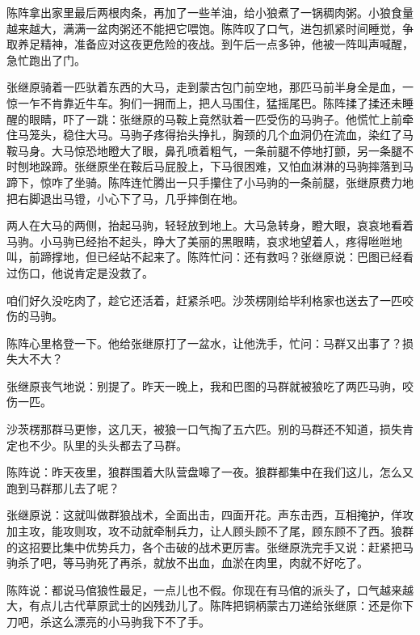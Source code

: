 

\par 陈阵拿出家里最后两根肉条，再加了一些羊油，给小狼煮了一锅稠肉粥。小狼食量越来越大，满满一盆肉粥还不能把它喂饱。陈阵叹了口气，进包抓紧时间睡觉，争取养足精神，准备应对这夜更危险的夜战。到午后一点多钟，他被一阵叫声喊醒，急忙跑出了门。
\par 张继原骑着一匹驮着东西的大马，走到蒙古包门前空地，那匹马前半身全是血，一惊一乍不肯靠近牛车。狗们一拥而上，把人马围住，猛摇尾巴。陈阵揉了揉还未睡醒的眼睛，吓了一跳：张继原的马鞍上竟然驮着一匹受伤的马驹子。他慌忙上前牵住马笼头，稳住大马。马驹子疼得抬头挣扎，胸颈的几个血洞仍在流血，染红了马鞍马身。大马惊恐地瞪大了眼，鼻孔喷着粗气，一条前腿不停地打颤，另一条腿不时刨地跺蹄。张继原坐在鞍后马屁股上，下马很困难，又怕血淋淋的马驹摔落到马蹄下，惊咋了坐骑。陈阵连忙腾出一只手攥住了小马驹的一条前腿，张继原费力地把右脚退出马镫，小心下了马，几乎摔倒在地。
\par 两人在大马的两侧，抬起马驹，轻轻放到地上。大马急转身，瞪大眼，哀哀地看着马驹。小马驹已经抬不起头，睁大了美丽的黑眼睛，哀求地望着人，疼得咝咝地叫，前蹄撑地，但已经站不起来了。陈阵忙问：还有救吗？张继原说：巴图已经看过伤口，他说肯定是没救了。
\par 咱们好久没吃肉了，趁它还活着，赶紧杀吧。沙茨楞刚给毕利格家也送去了一匹咬伤的马驹。
\par 陈阵心里格登一下。他给张继原打了一盆水，让他洗手，忙问：马群又出事了？损失大不大？
\par 张继原丧气地说：别提了。昨天一晚上，我和巴图的马群就被狼吃了两匹马驹，咬伤一匹。
\par 沙茨楞那群马更惨，这几天，被狼一口气掏了五六匹。别的马群还不知道，损失肯定也不少。队里的头头都去了马群。
\par 陈阵说：昨天夜里，狼群围着大队营盘嗥了一夜。狼群都集中在我们这儿，怎么又跑到马群那儿去了呢？
\par 张继原说：这就叫做群狼战术，全面出击，四面开花。声东击西，互相掩护，佯攻加主攻，能攻则攻，攻不动就牵制兵力，让人顾头顾不了尾，顾东顾不了西。狼群的这招要比集中优势兵力，各个击破的战术更厉害。张继原洗完手又说：赶紧把马驹杀了吧，等马驹死了再杀，就放不出血，血淤在肉里，肉就不好吃了。
\par 陈阵说：都说马倌狼性最足，一点儿也不假。你现在有马倌的派头了，口气越来越大，有点儿古代草原武士的凶残劲儿了。陈阵把铜柄蒙古刀递给张继原：还是你下刀吧，杀这么漂亮的小马驹我下不了手。

